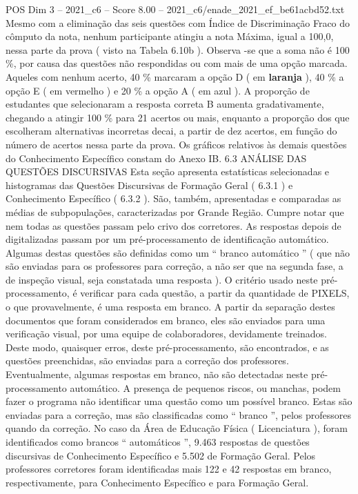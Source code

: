 \begin{textsample}{POS Dim 3 – 2021\_c6 – Score 8.00 – 2021\_c6/enade\_2021\_ef\_be61acbd52.txt}
Mesmo com a eliminação das seis questões com Índice de Discriminação Fraco do cômputo da nota, nenhum participante atingiu a nota Máxima, igual a 100,0, nessa parte da prova ( visto na Tabela 6.10b ).
Observa -se que a soma não é 100 \%, por causa das questões não respondidas ou com mais de uma opção marcada.
Aqueles com nenhum acerto, 40 \% marcaram a opção D ( em \textbf{laranja} ), 40 \% a opção E ( em vermelho ) e 20 \% a opção A ( em azul ).
A proporção de estudantes que selecionaram a resposta correta B aumenta gradativamente, chegando a atingir 100 \% para 21 acertos ou mais, enquanto a proporção dos que escolheram alternativas incorretas decai, a partir de dez acertos, em função do número de acertos nessa parte da prova.
Os gráficos relativos às demais questões do Conhecimento Específico constam do Anexo IB. 6.3 ANÁLISE DAS QUESTÕES DISCURSIVAS Esta seção apresenta estatísticas selecionadas e histogramas das Questões Discursivas de Formação Geral ( 6.3.1 ) e Conhecimento Específico ( 6.3.2 ).
São, também, apresentadas e comparadas as médias de subpopulações, caracterizadas por Grande Região.
Cumpre notar que nem todas as questões passam pelo crivo dos corretores.
As respostas depois de digitalizadas passam por um pré-processamento de identificação automático.
Algumas destas questões são definidas como um “ branco automático ” ( que não são enviadas para os professores para correção, a não ser que na segunda fase, a de inspeção visual, seja constatada uma resposta ).
O critério usado neste pré-processamento, é verificar para cada questão, a partir da quantidade de PIXELS, o que provavelmente, é uma resposta em branco.
A partir da separação destes documentos que foram considerados em branco, eles são enviados para uma verificação visual, por uma equipe de colaboradores, devidamente treinados.
Deste modo, quaisquer erros, deste pré-processamento, são encontrados, e as questões preenchidas, são enviadas para a correção dos professores.
Eventualmente, algumas respostas em branco, não são detectadas neste pré-processamento automático.
A presença de pequenos riscos, ou manchas, podem fazer o programa não identificar uma questão como um possível branco.
Estas são enviadas para a correção, mas são classificadas como “ branco ”, pelos professores quando da correção.
No caso da Área de Educação Física ( Licenciatura ), foram identificados como brancos “ automáticos ”, 9.463 respostas de questões discursivas de Conhecimento Específico e 5.502 de Formação Geral.
Pelos professores corretores foram identificadas mais 122 e 42 respostas em branco, respectivamente, para Conhecimento Específico e para Formação Geral.

\end{textsample}

